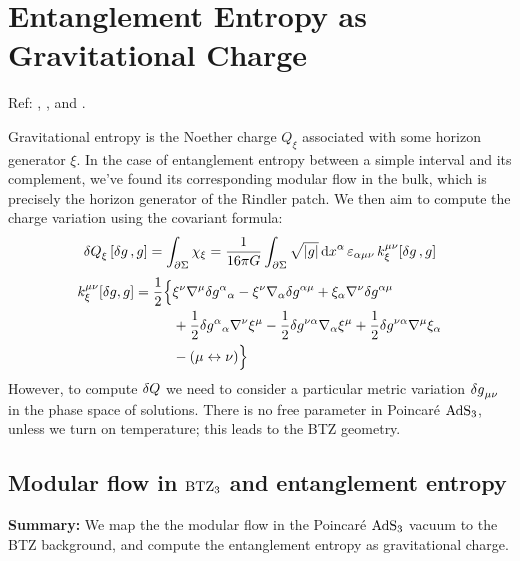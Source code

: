 \documentclass[11pt,a4paper]{article}
\begin{document}
	
\pagebreak
\section{Entanglement Entropy as Gravitational Charge}
	Ref: \textcite{Wald:1993nt,Iyer:1994ys,Iyer:1995kg}, \textcite{Lewkowycz:2013nqa}, and \textcite{Faulkner:2013ana}.
	
	Gravitational entropy is the Noether charge $Q_\xi$ associated with some horizon generator $\xi$. In the case of entanglement entropy between a simple interval and its complement, we've found its corresponding modular flow in the bulk, which is precisely the horizon generator of the Rindler patch. We then aim to compute the charge variation using the covariant formula:
	\begin{equation}
		\var{Q}_{\xi} [\var{g}, g]
		= \int_{\partial\Sigma}
			\chi_\xi
		= \frac{1}{16 \pi G}
			\int_{\partial\Sigma}
			\sqrt{|g|} \dd{x}^{\alpha}
				\varepsilon_{\alpha\mu\nu}\,
				k_\xi^{\mu\nu} [\var{g}, g]
	\end{equation}
	\begin{equation}
	\begin{aligned}
		k_\xi^{\mu\nu}[\var g, g]
		= \frac{1}{2} \Big \{
		& \xi^{\nu}\nabla^{\mu} \var g^{\alpha}{}_{\alpha}
		- \xi^{\nu} \nabla_{\alpha} \var g^{\alpha\mu}
		+ \xi_{\alpha} \nabla^{\nu} \var g^{\alpha\mu}  \\
		&+ \frac{1}{2} \var g^{\alpha}{}_{\alpha} \nabla^{\nu} \xi^{\mu}
		- \frac{1}{2} \var g^{\nu\alpha} \nabla_{\alpha}\xi^{\mu}
		+ \frac{1}{2} \var g^{\nu\alpha} \nabla^{\mu} \xi_{\alpha} \\
		&- (\mu \leftrightarrow \nu) \Big \}
	\end{aligned}
	\label{kdef}
	\end{equation}
	However, to compute $\var{Q}$ we need to consider a particular metric variation $\var{g}_{\mu\nu}$ in the phase space of solutions. There is no free parameter in Poincar\'e $\mathrm{AdS}_3$, unless we turn on temperature; this leads to the BTZ geometry. 
	
\subsection{Modular flow in $\mathrm{BTZ}_3$ and entanglement entropy}
\textbf{Summary:} We map the the modular flow in the Poincar\'e $\mathrm{AdS}_3$ vacuum to the BTZ background, and compute the entanglement entropy as gravitational charge. 
\end{document}
